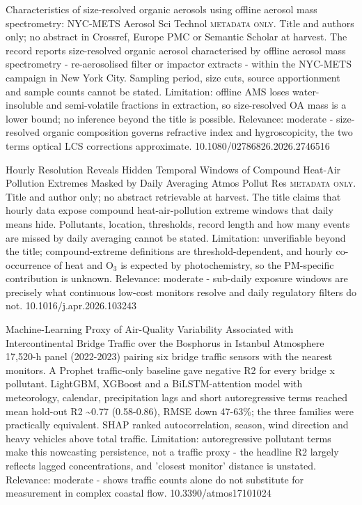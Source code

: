 \documentclass[10pt]{article}
\begin{document}
{Characteristics of size-resolved organic aerosols using offline aerosol mass spectrometry: NYC-METS}
{Aerosol Sci Technol}
{\textsc{metadata only.} Title and authors only; no abstract in Crossref, Europe PMC or Semantic Scholar at harvest. The record reports size-resolved organic aerosol characterised by offline aerosol mass spectrometry - re-aerosolised filter or impactor extracts - within the NYC-METS campaign in New York City. Sampling period, size cuts, source apportionment and sample counts cannot be stated. Limitation: offline AMS loses water-insoluble and semi-volatile fractions in extraction, so size-resolved OA mass is a lower bound; no inference beyond the title is possible. Relevance: moderate - size-resolved organic composition governs refractive index and hygroscopicity, the two terms optical LCS corrections approximate.}
{10.1080/02786826.2026.2746516}

{Hourly Resolution Reveals Hidden Temporal Windows of Compound Heat-Air Pollution Extremes Masked by Daily Averaging}
{Atmos Pollut Res}
{\textsc{metadata only.} Title and author only; no abstract retrievable at harvest. The title claims that hourly data expose compound heat-air-pollution extreme windows that daily means hide. Pollutants, location, thresholds, record length and how many events are missed by daily averaging cannot be stated. Limitation: unverifiable beyond the title; compound-extreme definitions are threshold-dependent, and hourly co-occurrence of heat and O$_3$ is expected by photochemistry, so the PM-specific contribution is unknown. Relevance: moderate - sub-daily exposure windows are precisely what continuous low-cost monitors resolve and daily regulatory filters do not.}
{10.1016/j.apr.2026.103243}

\par{}\baselineskip{}\baselineskip
{}

{Machine-Learning Proxy of Air-Quality Variability Associated with Intercontinental Bridge Traffic over the Bosphorus in Istanbul}
{Atmosphere}
{17,520-h panel (2022-2023) pairing six bridge traffic sensors with the nearest monitors. A Prophet traffic-only baseline gave negative R2 for every bridge x pollutant. LightGBM, XGBoost and a BiLSTM-attention model with meteorology, calendar, precipitation lags and short autoregressive terms reached mean hold-out R2 \textasciitilde{}0.77 (0.58-0.86), RMSE down 47-63\%; the three families were practically equivalent. SHAP ranked autocorrelation, season, wind direction and heavy vehicles above total traffic. Limitation: autoregressive pollutant terms make this nowcasting persistence, not a traffic proxy - the headline R2 largely reflects lagged concentrations, and 'closest monitor' distance is unstated. Relevance: moderate - shows traffic counts alone do not substitute for measurement in complex coastal flow.}
{10.3390/atmos17101024}
\end{document}
